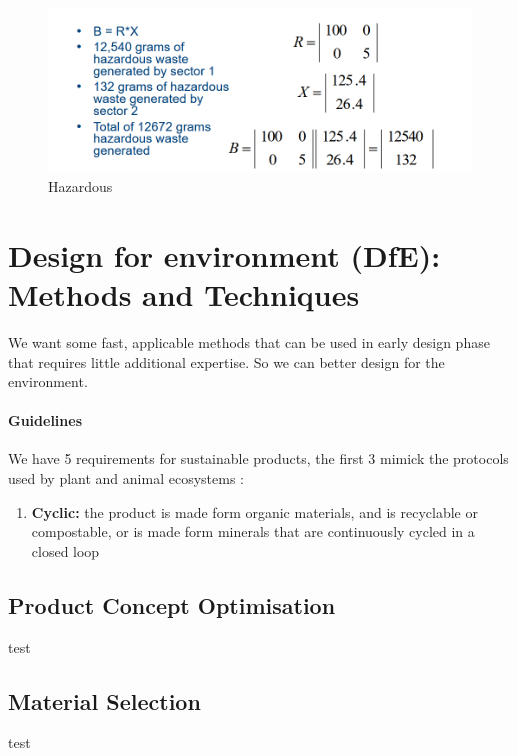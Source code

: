 \begin{figure}
\centering
\includegraphics{image-9.png}
\caption{Hazardous}
\end{figure}

\hypertarget{design-for-environment-dfe-methods-and-techniques}{%
\section{Design for environment (DfE): Methods and
Techniques}\label{design-for-environment-dfe-methods-and-techniques}}

We want some fast, applicable methods that can be used in early design
phase that requires little additional expertise. So we can better design
for the environment.

\hypertarget{guidelines}{%
\paragraph{Guidelines}\label{guidelines}}

We have 5 requirements for sustainable products, the first 3 mimick the
protocols used by plant and animal ecosystems :

\begin{enumerate}
\def\labelenumi{\arabic{enumi}.}
\tightlist
\item
  \textbf{Cyclic:} the product is made form organic materials, and is
  recyclable or compostable, or is made form minerals that are
  continuously cycled in a closed loop
\end{enumerate}

\hypertarget{product-concept-optimisation}{%
\subsection{Product Concept
Optimisation}\label{product-concept-optimisation}}

test

\hypertarget{material-selection}{%
\subsection{Material Selection}\label{material-selection}}

test
